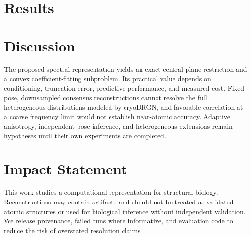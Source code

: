\documentclass{article}
\begin{document}
\section{Results}


\section{Discussion}
The proposed spectral representation yields an exact central-plane restriction and a convex coefficient-fitting subproblem. Its practical value depends on conditioning, truncation error, predictive performance, and measured cost. Fixed-pose, downsampled consensus reconstructions cannot resolve the full heterogeneous distributions modeled by cryoDRGN, and favorable correlation at a coarse frequency limit would not establish near-atomic accuracy. Adaptive anisotropy, independent pose inference, and heterogeneous extensions remain hypotheses until their own experiments are completed.

\section*{Impact Statement}
This work studies a computational representation for structural biology. Reconstructions may contain artifacts and should not be treated as validated atomic structures or used for biological inference without independent validation. We release provenance, failed runs where informative, and evaluation code to reduce the risk of overstated resolution claims.



\end{document}
